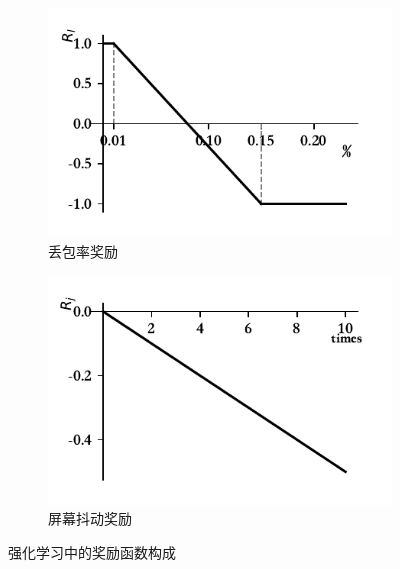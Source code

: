 \begin{figure}[ht]
\vspace{0.5em} %
\begin{subfigure}[t]{0.4\linewidth}
  \centering
  \includegraphics[width=\linewidth]{figures/chap03/reward_function/Rl.pdf}
  \caption{丢包率奖励}
  \label{fig:Loss Ratio Reward}
\end{subfigure}%
\hspace{0.05\linewidth} %
\begin{subfigure}[t]{0.4\linewidth}
  \centering
  \includegraphics[width=\linewidth]{figures/chap03/reward_function/Rj.pdf}
  \caption{屏幕抖动奖励}
  \label{fig:jitter Reward}
\end{subfigure}

\caption{强化学习中的奖励函数构成}
\label{fig:reward-function}
\end{figure}
